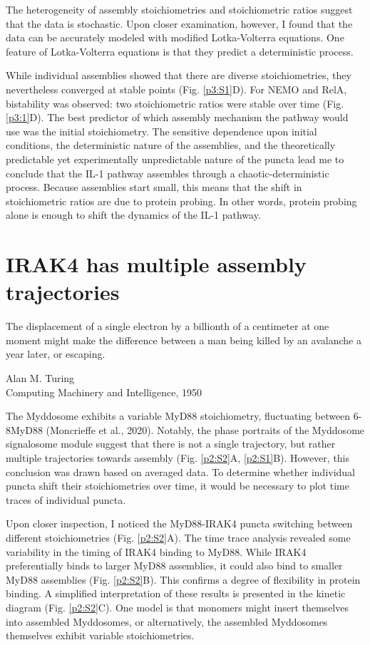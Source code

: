 The heterogeneity of assembly stoichiometries and stoichiometric ratios suggest that the data is stochastic. Upon closer examination, however, I found that the data can be accurately modeled with modified Lotka-Volterra equations. One feature of Lotka-Volterra equations is that they predict a deterministic process. 

While individual assemblies showed that there are diverse stoichiometries, they nevertheless converged at stable points (Fig. \ref{p3:S1}D). For NEMO and RelA, bistability was observed: two stoichiometric ratios were stable over time (Fig. \ref{p3:1}D). The best predictor of which assembly mechanism the pathway would use was the initial stoichiometry. The sensitive dependence upon initial conditions, the deterministic nature of the assemblies, and the theoretically predictable yet experimentally unpredictable nature of the puncta lead me to conclude that the IL-1 pathway assembles through a chaotic-deterministic process. Because assemblies start small, this means that the shift in stoichiometric ratios are due to protein probing. In other words, protein probing alone is enough to shift the dynamics of the IL-1 pathway.


\chapter{IRAK4 has multiple assembly trajectories}
\epigraph{The displacement of a single electron by a billionth of a centimeter at one moment might make the difference between a man being killed by an avalanche a year later, or escaping.}{Alan M. Turing\\Computing Machinery and Intelligence, 1950}

The Myddosome exhibits a variable MyD88 stoichiometry, fluctuating between 6-8\times MyD88 (Moncrieffe et al., 2020). Notably, the phase portraits of the Myddosome signalosome module suggest that there is not a single trajectory, but rather multiple trajectories towards assembly (Fig. \ref{p2:S2}A, \ref{p2:S1}B). However, this conclusion was drawn based on averaged data. To determine whether individual puncta shift their stoichiometries over time, it would be necessary to plot time traces of individual puncta.

Upon closer inspection, I noticed the MyD88-IRAK4 puncta switching between different stoichiometries (Fig. \ref{p2:S2}A). The time trace analysis revealed some variability in the timing of IRAK4 binding to MyD88. While IRAK4 preferentially binds to larger MyD88 assemblies, it could also bind to smaller MyD88 assemblies (Fig. \ref{p2:S2}B). This confirms a degree of flexibility in protein binding. A simplified interpretation of these results is presented in the kinetic diagram (Fig. \ref{p2:S2}C). One model is that monomers might insert themselves into assembled Myddosomes, or alternatively, the assembled Myddosomes themselves exhibit variable stoichiometries.

